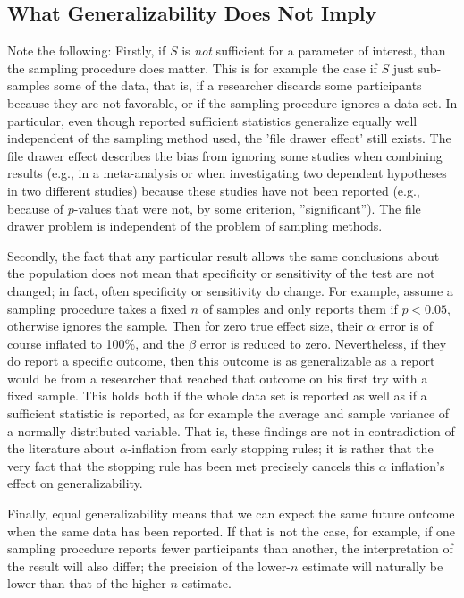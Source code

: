 \documentclass[man]{apa7}
\theoremstyle{definition}
\begin{document}
\subsection{What Generalizability Does Not Imply}
\label{sub:DoesNotImply}
Note the following: Firstly, if $S$ is \emph{not} sufficient for a parameter of interest, than the sampling procedure does matter. This is for example the case if $S$ just sub-samples some of the data, that is, if a researcher discards some participants because they are not favorable, or if the sampling procedure ignores a data set. In particular, even though reported sufficient statistics generalize equally well independent of the sampling method used, the 'file drawer effect' still exists. The file drawer effect describes the bias from ignoring some studies when combining results (e.g., in a meta-analysis or when investigating two dependent hypotheses in two different studies) because these studies have not been reported (e.g., because of $p$-values that were not, by some criterion, ''significant''). The file drawer problem is independent of the problem of sampling methods.

Secondly, the fact that any particular result allows the same conclusions about the population does not mean that specificity or sensitivity of the test are not changed; in fact, often specificity or sensitivity do change. For example, assume a sampling procedure takes a fixed $n$ of samples and only reports them if $p < 0.05$, otherwise ignores the sample. Then for zero true effect size, their $\alpha$ error is of course inflated to 100\%, and the $\beta$ error is reduced to zero. Nevertheless, if they do report a specific outcome, then this outcome is as generalizable as a report would be from a researcher that reached that outcome on his first try with a fixed sample. This holds both if the whole data set is reported as well as if a sufficient statistic is reported, as for example the average and sample variance of a normally distributed variable. That is, these findings are not in contradiction of the literature about $\alpha$-inflation from early stopping rules; it is rather that the very fact that the stopping rule has been met precisely cancels this $\alpha$ inflation's effect on generalizability.

Finally, equal generalizability means that we can expect the same future outcome when the same data has been reported. If that is not the case, for example, if one sampling procedure reports fewer participants than another, the interpretation of the result will also differ; the precision of the lower-$n$ estimate will naturally be lower than that of the higher-$n$ estimate. 
\end{document}
